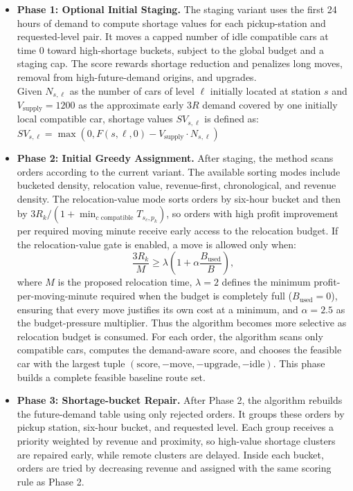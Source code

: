 \documentclass[10pt,a4paper]{article}
\begin{document}
\begin{itemize}[itemsep=2pt, parsep=0pt, topsep=4pt]
    \item \textbf{Phase 1: Optional Initial Staging.} The staging variant uses the first 24 hours of demand to compute shortage values for each pickup-station and requested-level pair.  It moves a capped number of idle compatible cars at time 0 toward high-shortage buckets, subject to the global budget and a staging cap.  The score rewards shortage reduction and
    penalizes long moves, removal from high-future-demand origins, and upgrades.\\
    Given $N_{s, \ell}$ as the number of cars of level $\ell$ initially located at station $s$ and $V_{\text{supply}}=1200$ as the approximate early $3R$ demand covered by one
    initially local compatible car, shortage values $SV_{s, \ell}$ is defined as:
    $SV_{s, \ell} = \max\left(0, F(s, \ell, 0) - V_{\text{supply}} \cdot N_{s, \ell}\right)$

    \item \textbf{Phase 2: Initial Greedy Assignment.} After staging, the method
    scans orders according to the current variant.  The available sorting modes
    include bucketed density, relocation value, revenue-first, chronological,
    and revenue density.  The relocation-value mode sorts orders by six-hour
    bucket and then by $3R_k / (1+\min_{c\text{ compatible}}T_{s_c,p_k})$,
    so orders with high profit improvement per required moving minute receive
    early access to the relocation budget.  If the relocation-value gate is
    enabled, a move is allowed only when:
    \[
    \frac{3R_k}{M}\ge \lambda\left(1+\alpha\frac{B_{\text{used}}}{B}\right),
    \]
    where $M$ is the proposed relocation time, $\lambda=2$ defines the minimum profit-per-moving-minute required when the budget is completely full ($B_{\text{used}} = 0$), ensuring that every move justifies its own cost at a minimum, and $\alpha=2.5$ as the budget-pressure multiplier.  
    Thus the algorithm becomes more
    selective as relocation budget is consumed.  For each order, the algorithm
    scans only compatible cars, computes the demand-aware score, and chooses the
    feasible car with the largest tuple $(\text{score},-\text{move},-\text{upgrade},-\text{idle}).$
    This phase builds a complete feasible baseline route set.

    \item \textbf{Phase 3: Shortage-bucket Repair.} After Phase 2, the algorithm
    rebuilds the future-demand table using only rejected orders.  It groups
    these orders by pickup station, six-hour bucket, and requested level.  Each
    group receives a priority weighted by revenue and proximity,
    so high-value shortage clusters are repaired early, while remote clusters
    are delayed.  Inside each bucket, orders are tried by decreasing revenue and
    assigned with the same scoring rule as Phase 2.


\end{itemize}
\end{document}
